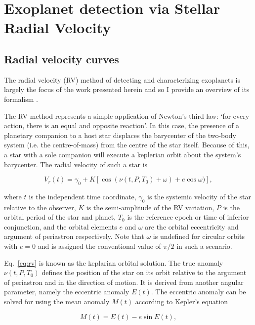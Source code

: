 \section{Exoplanet detection via Stellar Radial Velocity} \label{sect:rv}
\subsection{Radial velocity curves}
The radial velocity (RV) method of detecting and characterizing exoplanets is largely
the focus of the work presented herein and so I provide an overview of its formalism . 

The RV method represents a simple 
application of Newton's third law: `for every action, there is an equal 
and opposite reaction'. In this case, the presence of a planetary companion to a 
host star displaces the barycenter of the two-body system (i.e. the centre-of-mass) from the
centre of the star  itself. Because of this, a star with a sole companion 
will execute a keplerian orbit about the system's barycenter. The radial velocity of such a star
is

\begin{equation}
V_r(t) = \gamma_0 + K[\cos{(\nu(t,P,T_0) + \omega)} + e\cos{\omega})],
\label{eq:rv}
\end{equation}

\noindent where $t$ is the independent time coordinate, $\gamma_0$ is the systemic velocity of
the star relative to the observer, $K$ is the semi-amplitude of the RV variation,
$P$ is the orbital period of the star and planet, 
$T_0$ is the reference epoch or time of inferior conjunction, and
the orbital elements $e$ and $\omega$ are the orbital eccentricity and argument of
periastron respectively. Note that $\omega$ is undefined for circular orbits with
$e=0$ and is assigned the conventional value of $\pi/2$ in such a scenario.

Eq.~\ref{eq:rv} is known as the keplarian orbital solution.
The true anomaly $\nu(t,P,T_0)$ defines the position of the star on its orbit 
relative to the argument of periastron and in the direction of motion. It is derived 
from another angular parameter, namely the eccentric anomaly $E(t)$. The eccentric 
anomaly can be solved for using the mean anomaly $M(t)$ according to 
Kepler's equation

\begin{equation}
M(t) = E(t)-e\sin{E(t)},
\label{eq:kepler} 
\end{equation}


